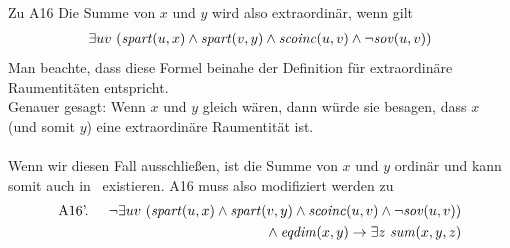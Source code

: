 \documentclass[10pt,xcolor={dvipsnames}]{beamer}
\begin{document}


\begin{frame}{\bso}{Zu A16}
    Die Summe von $x$ und $y$ wird also extraordinär, wenn gilt
    \begin{align*}
        \exists uv\ (\mathit{spart}(u,x) \wedge \mathit{spart}(v,y) \wedge \mathit{scoinc}(u,v) \wedge \neg \mathit{sov}(u,v))
    \end{align*}
    Man beachte, dass diese Formel beinahe der Definition für extraordinäre Raumentitäten entspricht.\\ 
    Genauer gesagt: Wenn $x$ und $y$ gleich wären, dann würde sie besagen, dass $x$ (und somit $y$) eine extraordinäre Raumentität ist.
    \\ \ \\
    Wenn wir diesen Fall ausschließen, ist die Summe von $x$ und $y$ ordinär und kann somit auch in \bso\ existieren.
    A16 muss also modifiziert werden zu
    \begin{align*}
        \text{A16'. }\quad  \neg \exists uv\ (\mathit{spart}(u,x) \wedge \mathit{spart}(v,y) \wedge \mathit{scoinc}(u,v) \wedge \neg \mathit{sov}(u,v))\\
        \mbox{}\wedge \mathit{eqdim}(x,y)
        \to \exists z\ \mathit{sum}(x,y,z)
    \end{align*}
\end{frame}
\end{document}
